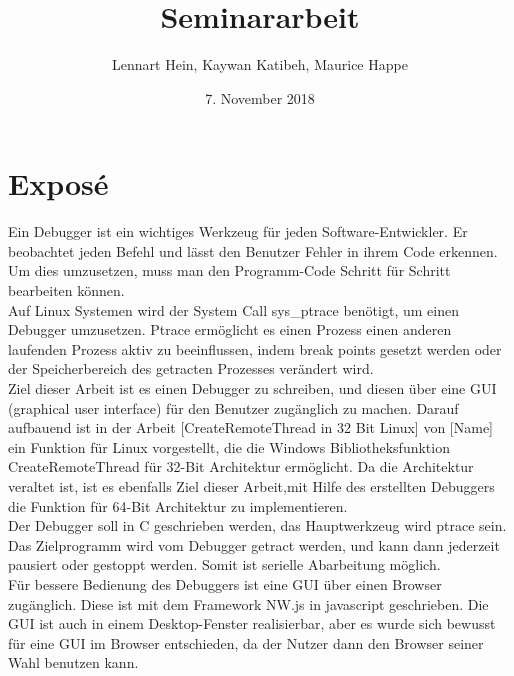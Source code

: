 \documentclass{article}
\title{Seminararbeit}
\author{Lennart Hein, Kaywan Katibeh, Maurice Happe}
\date{7. November 2018}
\begin{document}
\maketitle

\onehalfspacing

\section{Exposé}
Ein Debugger ist ein wichtiges Werkzeug für jeden Software-Entwickler.
Er beobachtet jeden Befehl und lässt den Benutzer Fehler in ihrem Code erkennen. Um dies umzusetzen, muss man den Programm-Code Schritt für Schritt bearbeiten können.
\\Auf Linux Systemen wird der System Call sys\_ptrace benötigt, um einen Debugger umzusetzen. Ptrace ermöglicht es einen Prozess einen anderen laufenden Prozess aktiv zu beeinflussen, indem break points gesetzt werden oder der Speicherbereich des getracten Prozesses verändert wird. 
\\Ziel dieser Arbeit ist es einen Debugger zu schreiben, und diesen über eine GUI (graphical user interface) für den Benutzer zugänglich zu machen. Darauf aufbauend ist in der Arbeit [CreateRemoteThread in 32 Bit Linux] von [Name] ein Funktion für Linux vorgestellt, die die Windows Bibliotheksfunktion CreateRemoteThread für 32-Bit Architektur ermöglicht. Da die Architektur veraltet ist, ist es ebenfalls Ziel dieser Arbeit,mit Hilfe des erstellten Debuggers die Funktion für 64-Bit Architektur zu implementieren.
\\Der Debugger soll in C geschrieben werden, das Hauptwerkzeug wird ptrace sein. Das Zielprogramm wird vom Debugger getract werden, und kann dann jederzeit pausiert oder gestoppt werden. Somit ist serielle Abarbeitung möglich.
\\Für bessere Bedienung des Debuggers ist eine GUI über einen Browser zugänglich. Diese ist mit dem Framework NW.js in javascript geschrieben. Die GUI ist auch in einem Desktop-Fenster realisierbar, aber es wurde sich bewusst für eine GUI im Browser entschieden, da der Nutzer dann den Browser seiner Wahl benutzen kann.
\end{document}
